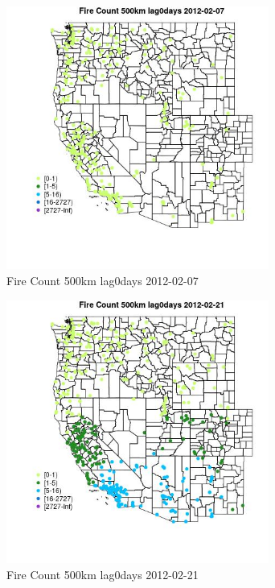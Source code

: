 \begin{figure} 
\centering  
\includegraphics[width=0.77\textwidth]{Code_Outputs/Report_ML_input_PM25_Step4_part_f_de_duplicated_aves_prioritize_24hr_obswNAs_MapObsFire_Count_500km_lag0days2012-02-07.jpg} 
\caption{\label{fig:Report_ML_input_PM25_Step4_part_f_de_duplicated_aves_prioritize_24hr_obswNAsMapObsFire_Count_500km_lag0days2012-02-07}Fire Count 500km lag0days 2012-02-07} 
\end{figure} 
 

\begin{figure} 
\centering  
\includegraphics[width=0.77\textwidth]{Code_Outputs/Report_ML_input_PM25_Step4_part_f_de_duplicated_aves_prioritize_24hr_obswNAs_MapObsFire_Count_500km_lag0days2012-02-21.jpg} 
\caption{\label{fig:Report_ML_input_PM25_Step4_part_f_de_duplicated_aves_prioritize_24hr_obswNAsMapObsFire_Count_500km_lag0days2012-02-21}Fire Count 500km lag0days 2012-02-21} 
\end{figure} 
 

